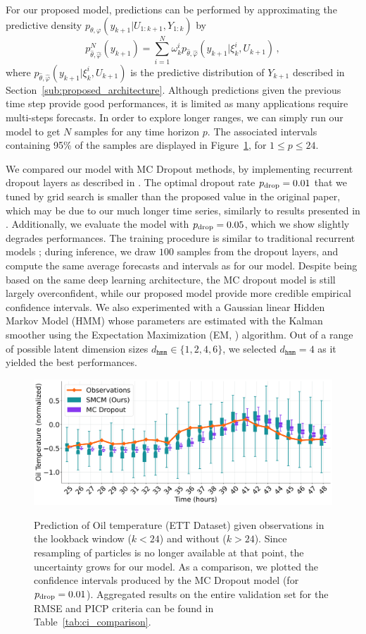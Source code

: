 \documentclass[conference]{IEEEtran}
\begin{document}
For our proposed model, predictions can be performed by approximating the predictive density $p_{\theta,\varphi}(y_{k+1}|U_{1:k+1},Y_{1:k})$ by
$$
	p^N_{\widehat\theta,\widehat\varphi}(y_{k+1})= \sum_{i=1}^{N}\omega_k^i p_{\widehat\theta,\widehat\varphi}(y_{k+1}|\xi_k^i,U_{k+1})\,,
$$
where $ p_{\widehat\theta,\widehat\varphi}(y_{k+1}|\xi_k^i,U_{k+1})$ is the predictive distribution of $Y_{k+1}$ described in Section~\ref{sub:proposed_architecture}.
Although predictions given the previous time step provide good performances, it is limited as many applications require multi-steps forecasts.
In order to explore longer ranges, we can simply run our model to get $N$ samples for any time horizon $p$.
The associated intervals containing 95\% of the samples are displayed in Figure~\ref{fig:filter_k+24}, for $1\leq p \leq 24$.

We compared our model with MC Dropout methods, by implementing recurrent dropout layers as described in \cite{Gal2016NIPS}.
The optimal dropout rate $p_\textnormal{drop}=0.01$ that we tuned by grid search is smaller than the proposed value in the original paper, which may be due to our much longer time series, similarly to results presented in \cite{Zhu2017DeepAC}.
Additionally, we evaluate the model with $p_\textnormal{drop}=0.05$, which we show slightly degrades performances.
The training procedure is similar to traditional recurrent models ; during inference, we draw $100$ samples from the dropout layers, and compute the same average forecasts and  intervals as for our model.
Despite being based on the same deep learning architecture, the MC dropout model is still largely overconfident, while our proposed model provide more credible empirical confidence intervals.
We also experimented with a Gaussian linear Hidden Markov Model (HMM) whose parameters are estimated with the Kalman smoother using the Expectation Maximization (EM, \cite{Dempster77EM}) algorithm.
Out of a range of possible latent dimension sizes $d_{\texttt{hmm}} \in \{1, 2, 4, 6\}$, we selected $d_{\texttt{hmm}}=4$ as it yielded the best performances.

\begin{figure}[htpb]
	\centering
	\caption{Prediction of Oil temperature (ETT Dataset) given observations in the lookback window ($k<24$) and without ($k>24$).
		Since resampling of particles is no longer available at that point, the uncertainty grows for our model.
		As a comparison, we plotted the confidence intervals produced by the MC Dropout model (for $p_\textnormal{drop}=0.01$).
		Aggregated results on the entire validation set for the RMSE and PICP criteria can be found in Table~\ref{tab:ci_comparison}.}
	\includegraphics[width=0.8\linewidth]{filter_kp24_ett.png}
	\label{fig:filter_k+24}
\end{figure}
\end{document}
